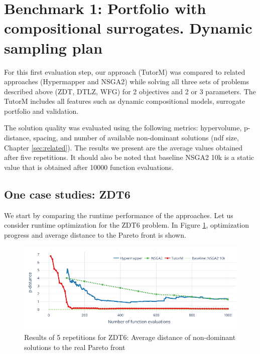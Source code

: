 \section{Benchmark 1: Portfolio with compositional surrogates. Dynamic sampling plan}
    For this first evaluation step, our approach (TutorM) was compared to related approaches (Hypermapper and NSGA2) while solving all three sets of problems described above (ZDT, DTLZ, WFG) for 2 objectives and 2 or 3 parameters. The TutorM includes all features such as dynamic compositional models, surrogate portfolio and validation. 

    The solution quality was evaluated using the following metrics: hypervolume, p-distance, spacing, and number of available non-dominant solutions (ndf size, Chapter \ref{sec:related}). The results we present are the average values obtained after five repetitions. It should also be noted that baseline NSGA2 10k is a static value that is obtained after 10000 function evaluations.

    \subsection*{One case studies: ZDT6}
    We start by comparing the runtime performance of the approaches. Let us consider runtime optimization for the ZDT6 problem. In Figure \ref{fig:zdt6_dist}, optimization progress and average distance to the Pareto front is shown. 
    
        \begin{figure}[h]
            \centering
            \includegraphics[width=\textwidth]{content/images/zdt6_dist}
            \caption[Results of 5 repetitions for ZDT6: Distance of non-dominant solutions to the real Pareto front]{Results of 5 repetitions for ZDT6: Average distance of non-dominant solutions to the real Pareto front}
            \label{fig:zdt6_dist}
        \end{figure}
        
